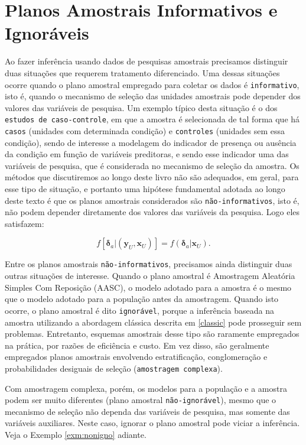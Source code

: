 \documentclass[]{book}
\theoremstyle{definition}
\theoremstyle{definition}
\theoremstyle{definition}
\theoremstyle{remark}
\begin{document}
\section{Planos Amostrais Informativos e Ignoráveis}\label{inform}

Ao fazer inferência usando dados de pesquisas amostrais precisamos
distinguir duas situações que requerem tratamento diferenciado. Uma
dessas situações ocorre quando o plano amostral empregado para coletar
os dados é \texttt{informativo}, isto é, quando o mecanismo de seleção
das unidades amostrais pode depender dos valores das variáveis de
pesquisa. Um exemplo típico desta situação é o dos
\texttt{estudos\ de\ caso-controle}, em que a amostra é selecionada de
tal forma que há \texttt{casos} (unidades com determinada condição) e
\texttt{controles} (unidades sem essa condição), sendo de interesse a
modelagem do indicador de presença ou ausência da condição em função de
variáveis preditoras, e sendo esse indicador uma das variáveis de
pesquisa, que é considerada no mecanismo de seleção da amostra. Os
métodos que discutiremos ao longo deste livro não são adequados, em
geral, para esse tipo de situação, e portanto uma hipótese fundamental
adotada ao longo deste texto é que os planos amostrais considerados são
\texttt{não-informativos}, isto é, não podem depender diretamente dos
valores das variáveis da pesquisa. Logo eles satisfazem:

\begin{equation}
f\left[ \mathbf{\delta }_a | \left( \mathbf{y}_U , \mathbf{x}_U \right)
\right] = f\left( \mathbf{\delta }_a | \mathbf{x}_U \right) . \label{eq:ref7}
\end{equation}

Entre os planos amostrais \texttt{não-informativos}, precisamos ainda
distinguir duas outras situações de interesse. Quando o plano amostral é
Amostragem Aleatória Simples Com Reposição (AASC), o modelo adotado para
a amostra é o mesmo que o modelo adotado para a população antes da
amostragem. Quando isto ocorre, o plano amostral é dito
\texttt{ignorável}, porque a inferência baseada na amostra utilizando a
abordagem clássica descrita em \ref{classic} pode prosseguir sem
problemas. Entretanto, esquemas amostrais desse tipo são raramente
empregados na prática, por razões de eficiência e custo. Em vez disso,
são geralmente empregados planos amostrais envolvendo estratificação,
conglomeração e probabilidades desiguais de seleção
(\texttt{amostragem\ complexa}).

Com amostragem complexa, porém, os modelos para a população e a amostra
podem ser muito diferentes (plano amostral \texttt{não-ignorável}),
mesmo que o mecanismo de seleção não dependa das variáveis de pesquisa,
mas somente das variáveis auxiliares. Neste caso, ignorar o plano
amostral pode viciar a inferência. Veja o Exemplo \ref{exm:nonigno}
adiante.
\end{document}
